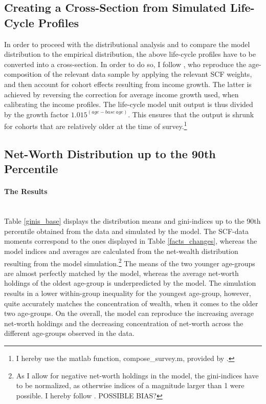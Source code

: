 \documentclass[a4paper,12pt,legno]{article}
\newcommand{\myparagraph}[1]{\paragraph{#1}\mbox{}\\}
\begin{document}
\subsection{Creating a Cross-Section from Simulated Life-Cycle Profiles}
In order to proceed with the distributional analysis and to compare the model distribution to the empirical distribution, the above life-cycle profiles have to be converted into a cross-section. In order to do so, I follow \cite{hintermaier2011}, who reproduce the age-composition of the relevant data sample by applying the relevant SCF weights, and then account for cohort effects resulting from income growth. The latter is achieved by reversing the correction for average income growth used, when calibrating the income profiles. The life-cycle model unit output is thus divided by the growth factor $1.015^{(age-base\ age)}$. This ensures that the output is shrunk for cohorts that are relatively older at the time of survey.\footnote{I hereby use the matlab function, compose\_survey.m, provided by \cite{hintermaier2016}.}

\subsection{Net-Worth Distribution up to the 90th Percentile}

\myparagraph{The Results}
Table \ref{ginis_base} displays the distribution means and gini-indices up to the 90th percentile obtained from the data and simulated by the model. The SCF-data moments correspond to the ones displayed in Table \ref{facts_changes}, whereas the model indices and averages are calculated from the net-wealth distribution resulting from the model simulation.\footnote{As I allow for negative net-worth holdings in the model, the gini-indices have to be normalized, as otherwise indices of a magnitude larger than 1 were possible. I hereby follow \cite{chen1982}. POSSIBLE BIAS?} The means of the two younger age-groups are almost perfectly matched by the model, whereas the average net-worth holdings of the oldest age-group is underpredicted by the model. The simulation results in a lower within-group inequality for the youngest age-group, however, quite accurately matches the concentration of wealth, when it comes to the older two age-groups. On the overall, the model can reproduce the increasing average net-worth holdings and the decreasing concentration of net-worth across the different age-groups observed in the data. 
\end{document}
